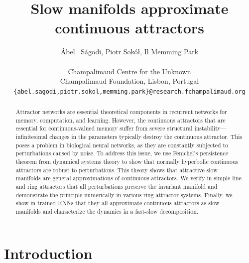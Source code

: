 \documentclass{article} %
\title{Slow manifolds approximate continuous attractors}
\author{%
    \'Abel ~S\'agodi, Piotr Sok\'o\l, Il Memming Park \\
    \\
    Champalimaud Centre for the Unknown\\
    Champalimaud Foundation, Lisbon, Portugal\\
    \texttt{\{abel.sagodi,piotr.sokol,memming.park\}@research.fchampalimaud.org} \\
}
\newcounter{ct}
\theoremstyle{definition}
\theoremstyle{remark}
\begin{document}
    


\maketitle

\begin{abstract}
Attractor networks are essential theoretical components in recurrent networks for memory, computation, and learning.
However, the continuous attractors that are essential for continuous-valued memory suffer from severe structural instability---infinitesimal changes in the parameters typically destroy the continuous attractor.
This poses a problem in biological neural networks, as they are constantly subjected to perturbations caused by noise.
To address this issue, we use Fenichel's persistence theorem from dynamical systems theory to show that normally hyperbolic continuous attractors are robust to perturbations. 
This theory shows that attractive slow manifolds are general approximations of continuous attractors.
We verify in simple line and ring attractors that all perturbations preserve the invariant manifold and demonstrate the principle numerically in various ring attractor systems.
Finally, we show in trained RNNs that they all approximate continuous attractors as slow manifolds and characterize the dynamics in a fast-slow decomposition.
\end{abstract}




\section{Introduction}
\end{document}
